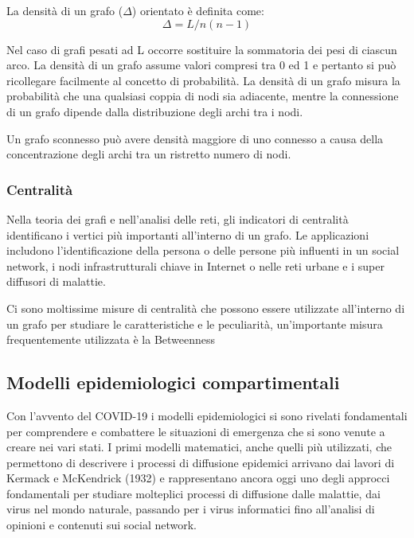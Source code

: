 \documentclass[11pt]{article}
\begin{document}
La densità di un grafo ($\Delta$) orientato è definita come:
\begin{equation}
    \Delta = L/n(n-1)
\end{equation}

Nel caso di grafi pesati ad L occorre sostituire la sommatoria dei pesi di ciascun arco.
La densità di un grafo assume valori compresi tra 0 ed 1 e pertanto si può ricollegare facilmente al concetto di probabilità. La densità di un grafo misura la probabilità che una qualsiasi coppia di nodi sia adiacente, mentre la connessione di un grafo dipende dalla distribuzione degli archi tra i nodi.

Un grafo sconnesso può avere densità maggiore di uno connesso a causa della concentrazione degli archi tra un ristretto numero di nodi.

\subsubsection{Centralità}

Nella teoria dei grafi e nell'analisi delle reti, gli indicatori di centralità \cite{GrafoCentralita} identificano i vertici più importanti all'interno di un grafo. 
Le applicazioni includono l'identificazione della persona o delle persone più influenti in un social network, i nodi infrastrutturali chiave in Internet o nelle reti urbane e i super diffusori di malattie.

Ci sono moltissime misure di centralità che possono essere utilizzate all'interno di un grafo per studiare le caratteristiche e le peculiarità, un'importante misura frequentemente utilizzata è la Betweenness \cite{GrafoBetweenness}

\subsection{Modelli epidemiologici compartimentali}

Con l'avvento del COVID-19 i modelli epidemiologici si sono rivelati fondamentali per comprendere e combattere le situazioni di emergenza che si sono venute a creare nei vari stati.
I primi modelli matematici, anche quelli più utilizzati, che permettono di descrivere i processi di diffusione epidemici arrivano dai lavori di Kermack e McKendrick (1932) e rappresentano ancora oggi uno degli approcci fondamentali per studiare molteplici processi di diffusione dalle malattie, dai virus nel mondo naturale, passando per i virus informatici fino all'analisi di opinioni e contenuti sui social network.
\end{document}

